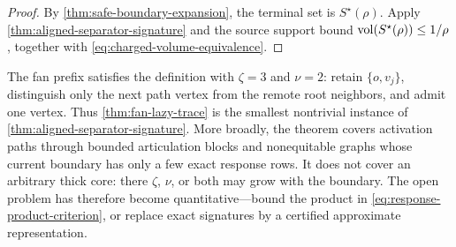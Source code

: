 \begin{proof}
By \cref{thm:safe-boundary-expansion}, the terminal set is
$S^\star(\rho)$.  Apply \cref{thm:aligned-separator-signature} and the source
support bound $\operatorname{vol}(S^\star(\rho))\leq1/\rho$, together with
\cref{eq:charged-volume-equivalence}.
\end{proof}

The fan prefix satisfies the definition with $\zeta=3$ and $\nu=2$: retain
$\{o,v_j\}$, distinguish only the next path vertex from the remote root
neighbors, and admit one vertex.  Thus
\cref{thm:fan-lazy-trace} is the smallest nontrivial instance of
\cref{thm:aligned-separator-signature}.  More broadly, the theorem covers
activation paths through bounded articulation blocks and nonequitable graphs
whose current boundary has only a few exact response rows.  It does not
cover an arbitrary thick core: there $\zeta$, $\nu$, or both may grow with
the boundary.  The open problem has therefore become quantitative---bound
the product in \cref{eq:response-product-criterion}, or replace exact
signatures by a certified approximate representation.
